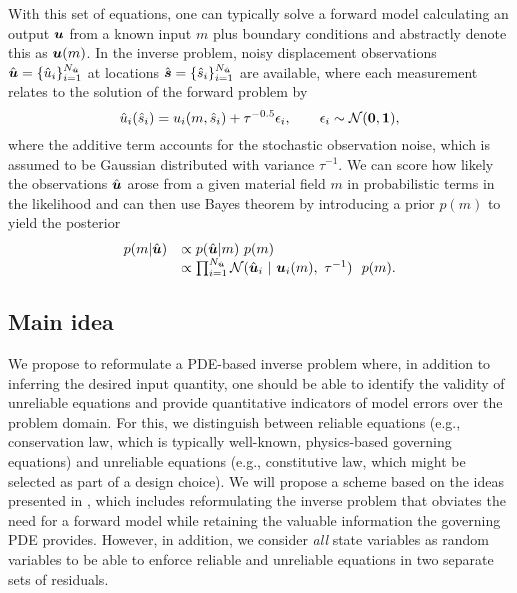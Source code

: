 With this set of equations, one can typically solve a forward model calculating an output $\boldsymbol{u}$ from a known input $m$ plus boundary conditions and abstractly denote this as $\boldsymbol{u}(m)$. In the inverse problem, noisy displacement observations $\hat{\boldsymbol{u}} = \{ \hat{u}_i \}_{i=1}^{N_{\hat{\boldsymbol{u}}}}$ at locations $\hat{\boldsymbol{s}}=\{ \hat{s}_i \}_{i=1}^{N_{\hat{\boldsymbol{u}}}}$ are available, where each measurement relates to the solution of the forward problem by
\begin{equation}
    \hat{u}_i(\hat{s}_i) = u_i(m, \hat{s}_i) + \tau^{-0.5}  \epsilon_i, \qquad \epsilon_i \sim \mathcal{N}(\boldsymbol{0}, \boldsymbol{1}), \label{eqn:obs}
\end{equation}
where the additive term accounts for the stochastic observation noise, which is assumed to be Gaussian distributed with variance $\tau^{-1}$. We can score how likely the observations $\hat{\boldsymbol{u}}$ arose from a given material field $m$ in probabilistic terms in the likelihood and can then use Bayes theorem by introducing a prior $p(m)$ to yield the posterior
\begin{equation}
    \begin{array}{ll}
        p(m | \hat{\boldsymbol{u}}) &  \propto p(\hat{\boldsymbol{u}}| m) ~p(m) \\
         & \propto \prod_{i=1}^{N_{\hat{\boldsymbol{u}}}} \mathcal{N} (\hat{\boldsymbol{u}}_i~|~\boldsymbol{u}_i(m), ~\tau^{-1}) ~~p(m).
    \end{array}
    \label{eqn:posterior_unnormed} 
\end{equation}


\subsection{Main idea}
We propose to reformulate a PDE-based inverse problem where, in addition to inferring the desired input quantity, one should be able to identify the validity of unreliable equations and provide quantitative indicators of model errors over the  problem domain. For this, we distinguish between reliable equations (e.g., conservation law, which is typically well-known, physics-based governing equations) and unreliable equations (e.g., constitutive law, which might be selected as part of a design choice). We will propose a scheme based on the ideas presented in \cite{scholz2025weak}, which includes reformulating the inverse problem that obviates the need for a forward model while retaining the valuable information the governing PDE provides. However, in addition, we consider \textit{all} state variables as random variables to be able to enforce reliable and unreliable equations in two separate sets of residuals.

